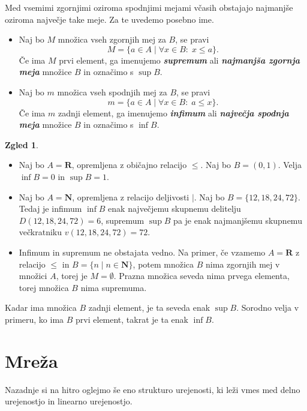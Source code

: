 \documentclass[11pt]{book}
\def\NN{\mathbf{N}}
\def\RR{\mathbf{R}}
\def\definicija{\color{rdeca}\bf\em}
\theoremstyle{definition}
\theoremstyle{zgled}
\newtheorem*{zgled}{Zgled}
\theoremstyle{odprtproblem}
\theoremstyle{domacanaloga}
\theoremstyle{izrek}
\begin{document}
Med vsemimi zgornjimi oziroma spodnjimi mejami včasih obstajajo najmanjše oziroma največje take meje. Za te uvedemo posebno ime.
\begin{itemize}
    \item Naj bo $M$ množica vseh zgornjih mej za $B$, se pravi
    \[
        M = \{ a \in A \mid \forall x \in B \colon \; x \leq a \}.
    \]
    Če ima $M$ prvi element, ga imenujemo {\definicija supremum} ali {\definicija najmanjša zgornja meja} množice $B$ in označimo s $\sup B$.
    
    \item Naj bo $m$ množica vseh spodnjih mej za $B$, se pravi
    \[
        m = \{ a \in A \mid \forall x \in B \colon \; a \leq x \}.
    \]
    Če ima $m$ zadnji element, ga imenujemo {\definicija infimum} ali {\definicija največja spodnja meja} množice $B$ in označimo s $\inf B$.
\end{itemize}

\begin{zgled} \leavevmode
    \begin{itemize}
        \item Naj bo $A = \RR$, opremljena z običajno relacijo $\leq$. Naj bo $B = (0,1)$. Velja
        $\inf B = 0$ in $\sup B = 1$.
        \item Naj bo $A = \NN$, opremljena z relacijo deljivosti $|$. Naj bo $B = \{ 12, 18, 24, 72 \}$. Tedaj je infimum $\inf B$ enak največjemu skupnemu delitelju $D(12, 18, 24, 72) = 6$, supremum $\sup B$ pa je enak najmanjšemu skupnemu večkratniku $v(12, 18, 24, 72) = 72$.
        \item Infimum in supremum ne obstajata vedno. Na primer, če vzamemo $A = \RR$ z relacijo $\leq$ in $B = \{ n \mid n \in \NN \}$, potem množica $B$ nima zgornjih mej v množici $A$, torej je $M = \emptyset$. Prazna množica seveda nima prvega elementa, torej množica $B$ nima supremuma.
    \end{itemize}
\end{zgled}

Kadar ima množica $B$ zadnji element, je ta seveda enak $\sup B$. Sorodno velja v primeru, ko ima $B$ prvi element, takrat je ta enak $\inf B$.

\section{Mreža}

Nazadnje si na hitro oglejmo še eno strukturo urejenosti, ki leži vmes med delno urejenostjo in linearno urejenostjo.
\end{document}
